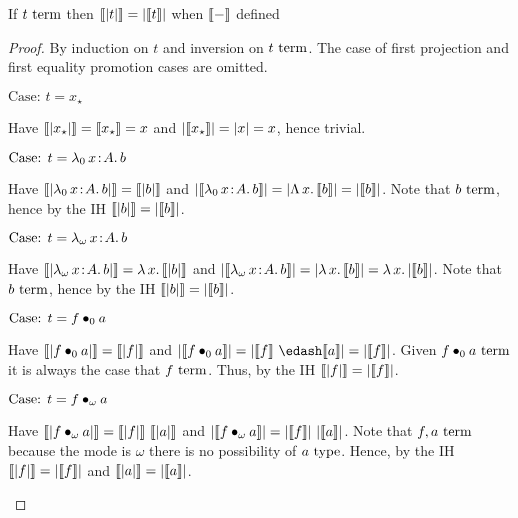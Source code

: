 \begin{lemma}
    \label{lem:4:sema_erasure}
    If $t~\textnormal{term}$ then $\llbracket |t| \rrbracket = |\llbracket t \rrbracket|$ when $\llbracket - \rrbracket$ defined
\end{lemma}
\begin{proof}
    By induction on $t$ and inversion on $t~\textnormal{term}$.
    The case of first projection and first equality promotion cases are omitted.

    $\text{Case: }t = x_\star$
    \begin{proofcase}
        Have $\llbracket |x_\star| \rrbracket = \llbracket x_\star \rrbracket = x$ and $|\llbracket x_\star \rrbracket| = |x| = x$, hence trivial.
    \end{proofcase}

    $\text{Case: }t = {\lambda_0}\, x\! : \! A.\, b$
    \begin{proofcase}
        Have $\llbracket |{\lambda_0}\, x\! : \! A.\, b| \rrbracket = \llbracket |b| \rrbracket$ and $|\llbracket {\lambda_0}\, x\! : \! A.\, b \rrbracket| = |{\Lambda}\, x.\, \llbracket b \rrbracket| = |\llbracket b \rrbracket|$.
        Note that $b~\textnormal{term}$, hence by the IH $\llbracket |b| \rrbracket = |\llbracket b \rrbracket|$.
    \end{proofcase}

    $\text{Case: }t = {\lambda_\omega}\, x\! : \! A.\, b$
    \begin{proofcase}
        Have $\llbracket |{\lambda_\omega}\, x\! : \! A.\, b| \rrbracket = {\lambda}\, x.\, \llbracket |b| \rrbracket$ and $|\llbracket {\lambda_\omega}\, x\! : \! A.\, b \rrbracket| = |{\lambda}\, x.\, \llbracket b \rrbracket| = {\lambda}\, x.\, |\llbracket b \rrbracket|$.
        Note that $b~\textnormal{term}$, hence by the IH $\llbracket |b| \rrbracket = |\llbracket b \rrbracket|$.
    \end{proofcase}

    $\text{Case: }t = f \bullet_{0} a$
    \begin{proofcase}
        Have $\llbracket |f \bullet_{0} a| \rrbracket = \llbracket |f| \rrbracket$ and $|\sema{\app{f}{0}{a}}| = |\sema{f}\ \edash \sema{a}| = |\sema{f}|$.
        Given $f \bullet_{0} a~\textnormal{term}$ it is always the case that $f~\textnormal{term}$.
        Thus, by the IH $\llbracket |f| \rrbracket = |\llbracket f \rrbracket|$.
    \end{proofcase}

    $\text{Case: }t = f \bullet_{\omega} a$
    \begin{proofcase}
        Have $\llbracket |f \bullet_{\omega} a| \rrbracket = \llbracket |f| \rrbracket\ \llbracket |a| \rrbracket$ and $|\sema{\app{f}{\omega}{a}}| = |\sema{f}|\ |\sema{a}|$.
        Note that $f, a~\textnormal{term}$ because the mode is $\omega$ there is no possibility of $a~\textnormal{type}$.
        Hence, by the IH $\llbracket |f| \rrbracket = |\llbracket f \rrbracket|$ and $\llbracket |a| \rrbracket = |\llbracket a \rrbracket|$.
    \end{proofcase}


\end{proof}
